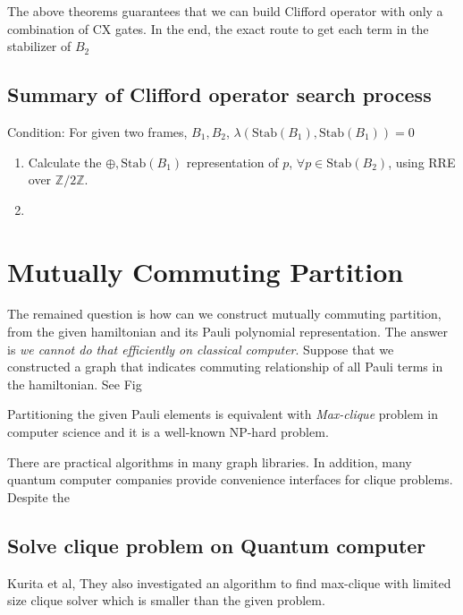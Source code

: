 \documentclass[a4paper,12pt]{article}
\begin{document}
The above theorems guarantees that we can build Clifford operator 
with only a combination of CX gates. 
In the end, the exact route to get each term in the stabilizer of $B_2$


\subsection{Summary of Clifford operator search process}

Condition: For given two frames, $B_1, B_2$, $\lambda(\mbox{Stab}(B_1), \mbox{Stab}(B_1)) = 0$

\begin{enumerate}
    \item Calculate the $\oplus, \mbox{Stab}(B_1)$ representation of $p$, $\forall p \in \mbox{Stab}(B_2)$, using RRE over $\mathbb{Z}/2 \mathbb{Z}$.
    \item 
\end{enumerate}



\section{Mutually Commuting Partition}

The remained question is how can we construct mutually commuting partition, 
from the given hamiltonian and its Pauli polynomial representation.
The answer is \textit{we cannot do that efficiently on classical computer}.
Suppose that we constructed a graph that indicates commuting relationship
of all Pauli terms in the hamiltonian. See Fig %

Partitioning the given Pauli elements is equivalent with \textit{Max-clique}
problem in computer science and it is a well-known NP-hard problem\cite{karp_reducibility_1972}.

There are practical algorithms in many graph libraries.%
 In addition, many quantum computer companies provide convenience interfaces for clique problems. 
Despite the

\subsection{Solve clique problem on Quantum computer}

Kurita et al, 
They also investigated an algorithm to find max-clique with limited size clique solver
which is smaller than the given problem.
\end{document}
